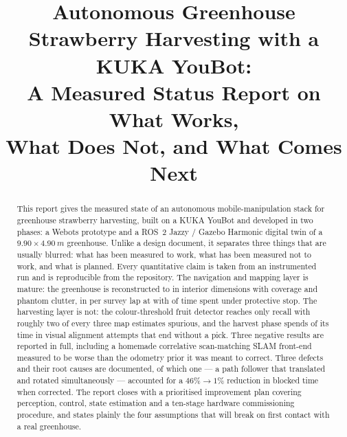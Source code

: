 \documentclass[conference]{IEEEtran}
\begin{document}
\title{Autonomous Greenhouse Strawberry Harvesting with a KUKA YouBot:\\
       A Measured Status Report on What Works,\\
       What Does Not, and What Comes Next}

\author{%
}

\maketitle

\begin{abstract}
This report gives the measured state of an autonomous mobile-manipulation
stack for greenhouse strawberry harvesting, built on a KUKA YouBot and
developed in two phases: a Webots prototype and a ROS~2 Jazzy / Gazebo
Harmonic digital twin of a $9.90 \times \SI{4.90}{m}$ greenhouse. Unlike a
design document, it separates three things that are usually blurred: what has
been measured to work, what has been measured not to work, and what is planned.
Every quantitative claim is taken from an instrumented run and is reproducible
from the repository. The navigation and mapping layer is mature: the greenhouse
is reconstructed to  in interior dimensions with
 coverage and  phantom clutter, in
 per survey lap at  with
 of time spent under protective stop. The harvesting layer is
not: the colour-threshold fruit detector reaches only  recall
with roughly two of every three map estimates spurious, and the harvest phase
spends  of its time in visual alignment attempts that end
without a pick. Three negative results are reported in full, including a
homemade correlative scan-matching SLAM front-end measured to be worse than the
odometry prior it was meant to correct. Three defects and their root causes are
documented, of which one --- a path follower that translated and rotated
simultaneously --- accounted for a $46\%\!\rightarrow\!1\%$ reduction in
blocked time when corrected. The report closes with a prioritised improvement
plan covering perception, control, state estimation and a ten-stage hardware
commissioning procedure, and states plainly the four assumptions that will
break on first contact with a real greenhouse.
\end{abstract}
\end{document}

